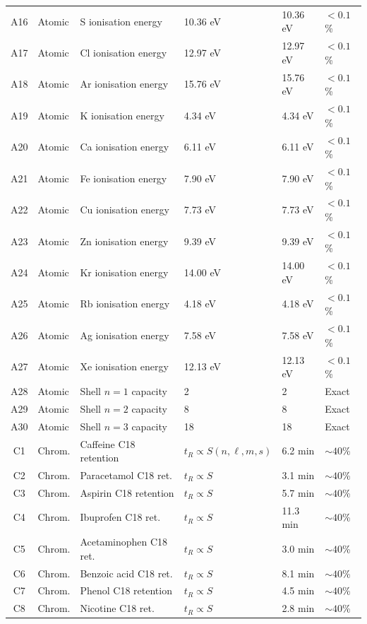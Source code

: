 \begin{longtable}{@{}clp{4.2cm}p{3cm}p{3cm}l@{}}
A16 & Atomic & S ionisation energy & 10.36 eV & 10.36 eV & $<0.1$\% \\
A17 & Atomic & Cl ionisation energy & 12.97 eV & 12.97 eV & $<0.1$\% \\
A18 & Atomic & Ar ionisation energy & 15.76 eV & 15.76 eV & $<0.1$\% \\
A19 & Atomic & K ionisation energy & 4.34 eV & 4.34 eV & $<0.1$\% \\
A20 & Atomic & Ca ionisation energy & 6.11 eV & 6.11 eV & $<0.1$\% \\
A21 & Atomic & Fe ionisation energy & 7.90 eV & 7.90 eV & $<0.1$\% \\
A22 & Atomic & Cu ionisation energy & 7.73 eV & 7.73 eV & $<0.1$\% \\
A23 & Atomic & Zn ionisation energy & 9.39 eV & 9.39 eV & $<0.1$\% \\
A24 & Atomic & Kr ionisation energy & 14.00 eV & 14.00 eV & $<0.1$\% \\
A25 & Atomic & Rb ionisation energy & 4.18 eV & 4.18 eV & $<0.1$\% \\
A26 & Atomic & Ag ionisation energy & 7.58 eV & 7.58 eV & $<0.1$\% \\
A27 & Atomic & Xe ionisation energy & 12.13 eV & 12.13 eV & $<0.1$\% \\
A28 & Atomic & Shell $n=1$ capacity & 2 & 2 & Exact \\
A29 & Atomic & Shell $n=2$ capacity & 8 & 8 & Exact \\
A30 & Atomic & Shell $n=3$ capacity & 18 & 18 & Exact \\
C1  & Chrom. & Caffeine C18 retention & $t_R\propto S(n,\ell,m,s)$ & 6.2 min & $\sim 40$\% \\
C2  & Chrom. & Paracetamol C18 ret. & $t_R\propto S$ & 3.1 min & $\sim 40$\% \\
C3  & Chrom. & Aspirin C18 retention & $t_R\propto S$ & 5.7 min & $\sim 40$\% \\
C4  & Chrom. & Ibuprofen C18 ret. & $t_R\propto S$ & 11.3 min & $\sim 40$\% \\
C5  & Chrom. & Acetaminophen C18 ret. & $t_R\propto S$ & 3.0 min & $\sim 40$\% \\
C6  & Chrom. & Benzoic acid C18 ret. & $t_R\propto S$ & 8.1 min & $\sim 40$\% \\
C7  & Chrom. & Phenol C18 retention & $t_R\propto S$ & 4.5 min & $\sim 40$\% \\
C8  & Chrom. & Nicotine C18 ret. & $t_R\propto S$ & 2.8 min & $\sim 40$\% \\

\end{longtable}

